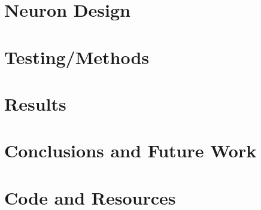 \documentclass[12pt, letterpaper, oneside, onecolumn]{report} %
\begin{document}
\chapter{Neuron Design}
\label{chap:neuron_design}


\chapter{Testing/Methods}
\label{chap:methods}


\chapter{Results}
\label{chap:results}


\chapter{Conclusions and Future Work}
\label{chap:conclusion}


\newpage
\appendix
{}
\chapter{Code and Resources}
\label{app:resources}


\newpage
\label{chap:references}
\printbibliography[heading=bibintoc, title={Bibliography}]
\end{document}
